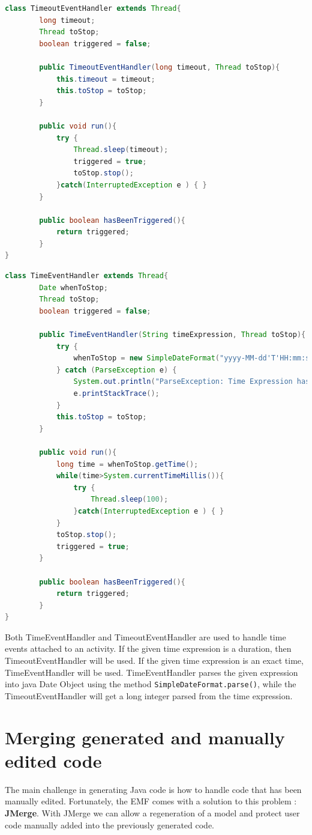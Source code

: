 \begin{lstlisting}[language=Java , caption=TimeoutEventHandler implementation]
class TimeoutEventHandler extends Thread{
		long timeout;
		Thread toStop;
		boolean triggered = false;
		
		public TimeoutEventHandler(long timeout, Thread toStop){
			this.timeout = timeout;
			this.toStop = toStop;
		}
		
		public void run(){
			try {
				Thread.sleep(timeout);
				triggered = true;
				toStop.stop();
			}catch(InterruptedException e ) { }
		}
		
		public boolean hasBeenTriggered(){
			return triggered;
		}
}
\end{lstlisting}
\newpage
\begin{lstlisting}[language=Java , caption=TimeEventHandler implementation]
class TimeEventHandler extends Thread{
		Date whenToStop;
		Thread toStop;
		boolean triggered = false;
		
		public TimeEventHandler(String timeExpression, Thread toStop){
			try {
				whenToStop = new SimpleDateFormat("yyyy-MM-dd'T'HH:mm:ss.SSSZ").parse(timeExpression);
			} catch (ParseException e) {
				System.out.println("ParseException: Time Expression has to be in yyyy-MM-dd'T'HH:mm:ss.SSSZ format!");
				e.printStackTrace();
			} 
			this.toStop = toStop;
		}
		
		public void run(){
			long time = whenToStop.getTime();
			while(time>System.currentTimeMillis()){
				try {
					Thread.sleep(100);
				}catch(InterruptedException e ) { }
			}
			toStop.stop();
			triggered = true;
		}
		
		public boolean hasBeenTriggered(){
			return triggered;
		}
}
\end{lstlisting}


Both TimeEventHandler and TimeoutEventHandler are used to handle time events attached to an activity. If the given time expression is a duration, then TimeoutEventHandler will be used. If the given time expression is an exact time, TimeEventHandler will be used. TimeEventHandler parses the given expression into java Date Object using the method \verb|SimpleDateFormat.parse()|, while the TimeoutEventHandler will get a long integer parsed from the time expression. 


\section{Merging generated and manually edited code}
The main challenge in generating Java code is how to handle code that has been manually edited. Fortunately, the EMF comes with a solution to this problem : \textbf{JMerge}\cite{JMERGEFAQ}. With JMerge we can allow a regeneration of a model and protect user code manually added into the previously generated code. 

